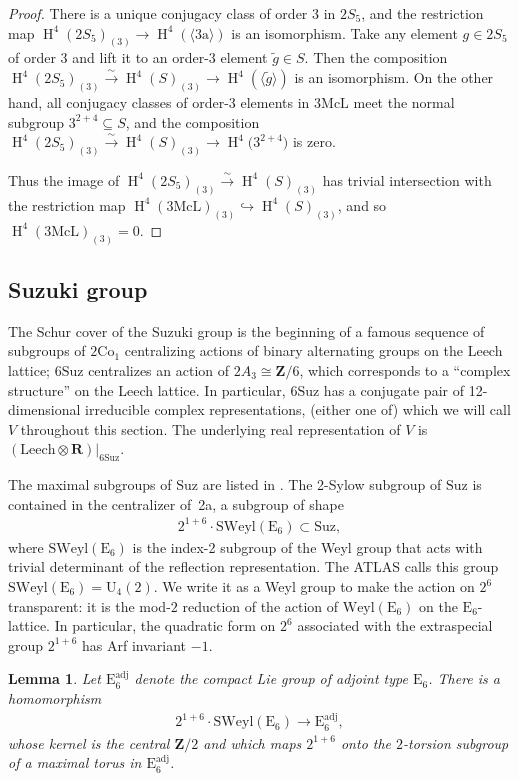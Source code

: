 \documentclass[pdftex]{sigma}
\numberwithin{equation}{section}
\newtheorem{Lemma}[Theorem]{Lemma}
\newcommand\bR{\mathbf R}
\newcommand\bZ{\mathbf Z}
\newcommand\ra{\mathrm a}
\newcommand\rE{\mathrm E}
\newcommand\rU{\mathrm U}
\DeclareMathOperator\homology{H}
\renewcommand\H{\homology}
\newcommand\<\langle
\renewcommand\>\rangle
\newcommand\Co{\mathrm{Co}}
\newcommand\Leech{\mathrm{Leech}}
\newcommand\Suz{\mathrm{Suz}}
\newcommand\SWeyl{\mathrm{SWeyl}}
\begin{document}
\begin{proof}
 There is a unique conjugacy class of order $3$ in $2S_5$, and the restriction map $\H^4(2S_5)_{(3)} \to \H^4(\langle 3\ra\rangle)$ is an isomorphism. Take any element $g \in 2S_5$ of order $3$ and lift it to an order-$3$ element $\tilde g \in S$. Then the composition $\H^4(2S_5)_{(3)} \overset\sim\to \H^4(S)_{(3)} \to \H^4(\langle \tilde g \rangle)$ is an isomorphism. On the other hand, all conjugacy classes of order-$3$ elements in $3\mathrm{McL}$ meet the normal subgroup $3^{2+4} \subseteq S$, and the composition $\H^4(2S_5)_{(3)} \overset\sim\to \H^4(S)_{(3)} \to \H^4\big(3^{2+4}\big)$ is zero.

 Thus the image of $\H^4(2S_5)_{(3)} \overset\sim\to \H^4(S)_{(3)}$ has trivial intersection with the restriction map $\H^4(3\mathrm{McL})_{(3)} \hookrightarrow \H^4(S)_{(3)}$, and so $\H^4(3\mathrm{McL})_{(3)} = 0$.
\end{proof}

\subsection{Suzuki group}\label{sec.suz}

The Schur cover of the Suzuki group is the beginning of a famous sequence of subgroups of $2\Co_1$ centralizing actions of binary alternating groups on the Leech lattice; $6\Suz$ centralizes an action of $2A_3 \cong \bZ/6$, which corresponds to a ``complex structure'' on the Leech lattice. In particular, $6\Suz$ has a conjugate pair of 12-dimensional irreducible complex representations, (either one of) which we will call $V$ throughout this section. The underlying real representation of $V$ is $(\Leech \otimes \bR)|_{6\Suz}$.

The maximal subgroups of $\Suz$ are listed in \cite{MR716777}. The 2-Sylow subgroup of $\Suz$ is contained in {the centralizer of~2a}, a subgroup of shape
\begin{gather*}
2^{1+6}\cdot\SWeyl (\rE_6) \subset \Suz,
\end{gather*}
where $\SWeyl(\rE_6)$ is the index-2 subgroup of the Weyl group that acts with trivial determinant of the reflection representation. The ATLAS calls this group $\SWeyl (\rE_6) = \rU_4(2)$. We write it as a Weyl group to make the action on $2^6$ transparent: it is the mod-$2$ reduction of the action of $\mathrm{Weyl}(\rE_6)$ on the $\rE_6$-lattice. In particular, the quadratic form on $2^6$ associated with the extraspecial group $2^{1+6}$ has Arf invariant $-1$.

\begin{Lemma}\label{lem:inE6}
Let $\mathrm{E}_6^{\mathrm{adj}}$ denote the compact Lie group of adjoint type $\mathrm{E}_6$. There is a homomorphism
\begin{gather*}
2^{1+6}\cdot \SWeyl(\rE_6) \to \mathrm{E}_6^{\mathrm{adj}},
\end{gather*}
whose kernel is the central $\bZ/2$ and which maps $2^{1+6}$ onto the $2$-torsion subgroup of a maximal torus in $\mathrm{E}_6^{\mathrm{adj}}$.
\end{Lemma}
\end{document}
